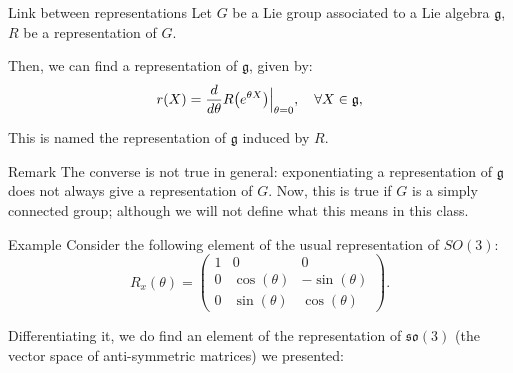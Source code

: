 \documentclass[a4paper]{article}
\begin{document}
\begin{parag}{Link between representations}
    Let $G$ be a Lie group associated to a Lie algebra $\mathfrak{g}$, $R$ be a representation of $G$.

    Then, we can find a representation of $\mathfrak{g}$, given by: 
    \[r\left(X\right) = \frac{d}{d\theta} R\left(e^{\theta X}\right) \eval_{\theta = 0}, \mathspace\forall X \in \mathfrak{g},\]
    
    This is named the representation of $\mathfrak{g}$ induced by $R$.

    \begin{subparag}{Remark}
        The converse is not true in general: exponentiating a representation of $\mathfrak{g}$ does not always give a representation of $G$. Now, this is true if $G$ is a simply connected group; although we will not define what this means in this class.
    \end{subparag}

    \begin{subparag}{Example}
        Consider the following element of the usual representation of $SO\left(3\right)$: 
        \[R_x\left(\theta\right) = \begin{pmatrix} 1 & 0 & 0 \\ 0 & \cos\left(\theta\right) & -\sin\left(\theta\right) \\ 0 & \sin\left(\theta\right) & \cos\left(\theta\right) \end{pmatrix}.\]

        Differentiating it, we do find an element of the representation of $\mathfrak{so}\left(3\right)$ (the vector space of anti-symmetric matrices) we presented: 
    \end{subparag}
\end{parag}
\end{document}
